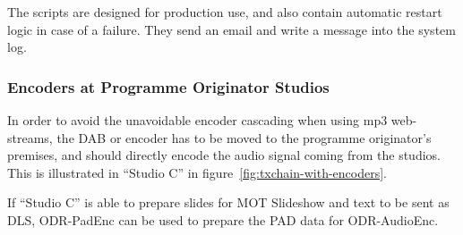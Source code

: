 The scripts are designed for production use, and also contain automatic restart
logic in case of a failure. They send an email and write a message into the
system log.

\subsubsection{Encoders at Programme Originator Studios}
In order to avoid the unavoidable encoder cascading when using mp3 web-streams,
the DAB or \dabplus encoder has to be moved to the programme originator's
premises, and should directly encode the audio signal coming from the studios.
This is illustrated in ``Studio C'' in figure~\ref{fig:txchain-with-encoders}.

If ``Studio C'' is able to prepare slides for MOT Slideshow and text to be sent
as DLS, ODR-PadEnc can be used to prepare the PAD data for ODR-AudioEnc.

